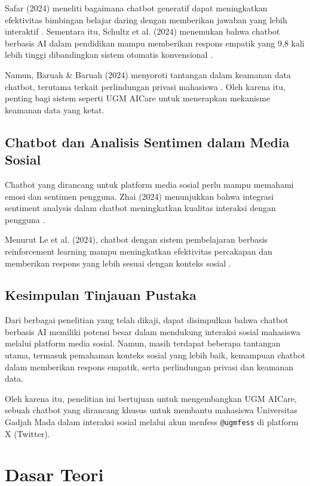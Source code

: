 Safar (2024) meneliti bagaimana chatbot generatif dapat meningkatkan efektivitas bimbingan belajar daring dengan memberikan jawaban yang lebih interaktif \cite{safar2024generative}. Sementara itu, Schultz et al. (2024) menemukan bahwa chatbot berbasis AI dalam pendidikan mampu memberikan respons empatik yang 9,8 kali lebih tinggi dibandingkan sistem otomatis konvensional \cite{schultz2024ai}.

Namun, Baruah \& Baruah (2024) menyoroti tantangan dalam keamanan data chatbot, terutama terkait perlindungan privasi mahasiswa \cite{baruah2024aiethics}. Oleh karena itu, penting bagi sistem seperti UGM AICare untuk menerapkan mekanisme keamanan data yang ketat.

\subsection{Chatbot dan Analisis Sentimen dalam Media Sosial}

Chatbot yang dirancang untuk platform media sosial perlu mampu memahami emosi dan sentimen pengguna. Zhai (2024) menunjukkan bahwa integrasi sentiment analysis dalam chatbot meningkatkan kualitas interaksi dengan pengguna \cite{zhai2024empathetic}.

Menurut Le et al. (2024), chatbot dengan sistem pembelajaran berbasis reinforcement learning mampu meningkatkan efektivitas percakapan dan memberikan respons yang lebih sesuai dengan konteks sosial \cite{le2024chatbot}.

\subsection{Kesimpulan Tinjauan Pustaka}

Dari berbagai penelitian yang telah dikaji, dapat disimpulkan bahwa chatbot berbasis AI memiliki potensi besar dalam mendukung interaksi sosial mahasiswa melalui platform media sosial. Namun, masih terdapat beberapa tantangan utama, termasuk pemahaman konteks sosial yang lebih baik, kemampuan chatbot dalam memberikan respons empatik, serta perlindungan privasi dan keamanan data.

Oleh karena itu, penelitian ini bertujuan untuk mengembangkan UGM AICare, sebuah chatbot yang dirancang khusus untuk membantu mahasiswa Universitas Gadjah Mada dalam interaksi sosial melalui akun menfess \texttt{@ugmfess} di platform X (Twitter).

\section{Dasar Teori}

